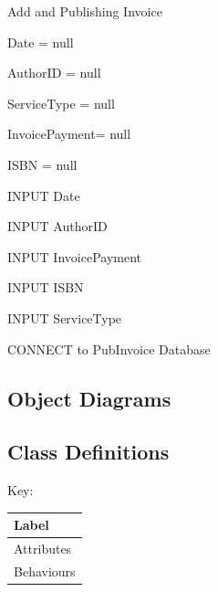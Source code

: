 \begin{algorithm}[H]
    \caption{Add and Publishing Invoice}
\begin{algorithmic}[1]



Date = null

AuthorID = null

ServiceType = null

InvoicePayment= null

ISBN = null


    INPUT Date

\EndWhile


    INPUT AuthorID

\EndWhile


    INPUT InvoicePayment

\EndWhile


    INPUT ISBN

\EndWhile


    INPUT ServiceType

\EndWhile

    
    CONNECT to PubInvoice Database
    
\EndIf

\EndFunction
\end{algorithmic}
\end{algorithm}



\subsection{Object Diagrams}

%

\subsection{Class Definitions}

Key:

\begin{tabular}{|p{2.5cm}|}
    \hline
    \textbf{Label}  \\ \hline
    Attributes \\ \hline
    Behaviours  \\ \hline
    \hline
\end{tabular}


